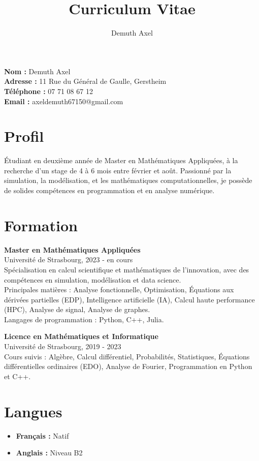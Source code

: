 \documentclass[a4paper,10pt]{article}
\begin{document}
\title{\huge{Curriculum Vitae}}
\author{Demuth Axel}
\date{}
\maketitle

\noindent
\textbf{Nom :} Demuth Axel \\
\textbf{Adresse :} 11 Rue du Général de Gaulle, Gerstheim \\
\textbf{Téléphone :} 07 71 08 67 12 \\
\textbf{Email :} axeldemuth67150@gmail.com \\

\section*{Profil}
Étudiant en deuxième année de Master en Mathématiques Appliquées, à la recherche d'un stage de 4 à 6 mois entre février et août. Passionné par la simulation, la modélisation, et les mathématiques computationnelles, je possède de solides compétences en programmation et en analyse numérique.

\section*{Formation}
\noindent
\textbf{Master en Mathématiques Appliquées} \\
Université de Strasbourg, 2023 - en cours \\
Spécialisation en calcul scientifique et mathématiques de l'innovation, avec des compétences en simulation, modélisation et data science. \\
Principales matières : Analyse fonctionnelle, Optimisation, Équations aux dérivées partielles (EDP), Intelligence artificielle (IA), Calcul haute performance (HPC), Analyse de signal, Analyse de graphes. \\
Langages de programmation : Python, C++, Julia.

\noindent
\textbf{Licence en Mathématiques et Informatique} \\
Université de Strasbourg, 2019 - 2023 \\
Cours suivis : Algèbre, Calcul différentiel, Probabilités, Statistiques, Équations différentielles ordinaires (EDO), Analyse de Fourier, Programmation en Python et C++.

\section*{Langues}
\begin{itemize}[label={}]
    \item \textbf{Français :} Natif
    \item \textbf{Anglais :} Niveau B2
\end{itemize}
\end{document}
